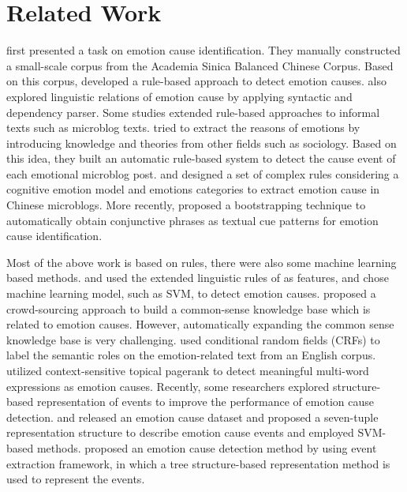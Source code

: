 \documentclass[letterpaper]{article} \usepackage{aaai19}  \usepackage{times}  \usepackage{helvet}  \usepackage{courier}  \usepackage{url}  \usepackage{graphicx}  \frenchspacing  \setlength{\pdfpagewidth}{8.5in}  \setlength{\pdfpageheight}{11in}  \setcounter{secnumdepth}{0}
\begin{document}
\section{Related Work}
\cite{lee2010text} first presented a task on emotion cause identification. They manually constructed a small-scale corpus from the Academia Sinica Balanced Chinese Corpus. Based on this corpus, \cite{lee2013detecting} developed a rule-based approach to detect emotion causes. \cite{neviarouskaya2013extracting} also explored linguistic relations of emotion cause by applying syntactic and dependency parser. Some studies extended rule-based approaches to informal texts such as microblog texts. \cite{li2014text} tried to extract the reasons of emotions by introducing knowledge and theories from other fields such as sociology. Based on this idea, they built an automatic rule-based system to detect the cause event of each emotional microblog post. \cite{gao2015emotion} and \cite{gao2015rule} designed a set of complex rules considering a cognitive emotion model and emotions categories to extract emotion cause in Chinese microblogs. More recently, \cite{yada2017bootstrap} proposed a bootstrapping technique to automatically obtain conjunctive phrases as textual cue patterns for emotion cause identification.

Most of the above work is based on rules, there were also some machine learning based methods. \cite{chen2010emotion} and \cite{gui2014emotion} used the extended linguistic rules of \cite{lee2010text} as features, and chose machine learning model, such as SVM, to detect emotion causes. \cite{russo2011emocause} proposed a crowd-sourcing approach to build a common-sense knowledge base which is related to emotion causes. However, automatically expanding the common sense knowledge base is very challenging. \cite{ghazi2015detecting} used conditional random fields (CRFs) to label the semantic roles on the emotion-related text from an English corpus. \cite{song2015detecting}  utilized context-sensitive topical pagerank to detect meaningful multi-word expressions as emotion causes. Recently, some researchers explored structure-based representation of events to improve the performance of emotion cause detection. \cite{gui2016event} and \cite{gui2016emotion} released an emotion cause dataset and proposed a seven-tuple representation structure to describe emotion cause events and employed SVM-based methods. \cite{xu2017ensemble} proposed an emotion cause detection method by using event extraction framework, in which a tree structure-based representation method is used to represent the events.
\end{document}
